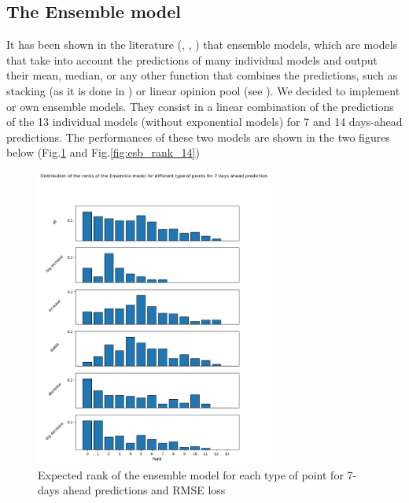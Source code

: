 \subsection{The Ensemble model}

It has been shown in the literature (\cite{cramer2022evaluation}, \cite{reich2019accuracy}, \cite{howerton2023evaluation}) that ensemble models, which are models that take into account the predictions of many individual models and output their mean, median, or any other function that combines the predictions, such as stacking (as it is done in \cite{reich2019accuracy}) or linear opinion pool (see \cite{howerton2023evaluation}).
We decided to implement or own ensemble models. 
They consist in a linear combination of the predictions of the 13 individual models (without exponential models) for 7 and 14 days-ahead predictions.
The performances of these two models are shown in the two figures below (Fig.\ref{fig:esb_rank_7} and Fig.\ref{fig:esb_rank_14})

\begin{figure}
    \centering
    \includegraphics[width=0.7\textwidth]{figures/esb_rank_7.png}
    \caption{Expected rank of the ensemble model for each type of point for 7-days ahead predictions and RMSE loss}
    \label{fig:esb_rank_7}
\end{figure}

